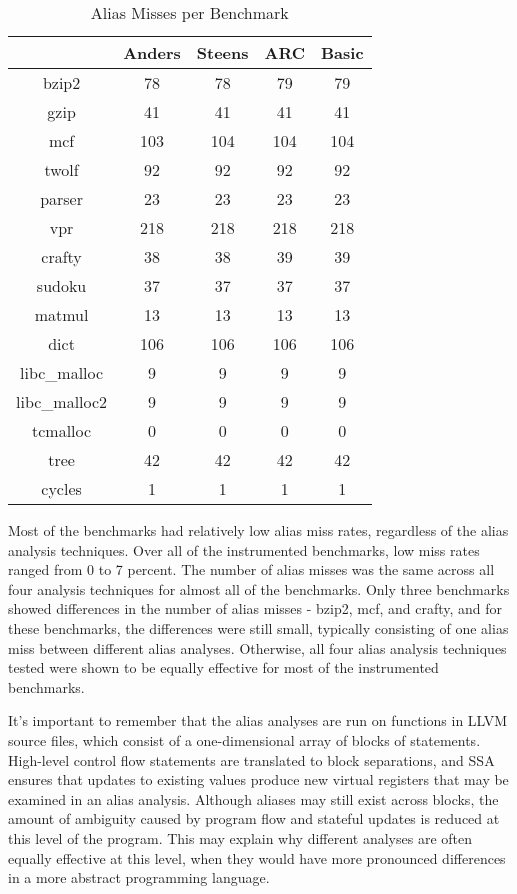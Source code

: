 \begin{table} [h!]
\centering
   \begin{tabular} {|c|c c c c|}
      \hline
      & Anders & Steens & ARC & Basic \\
      \hline
	   bzip2 & 78 & 78 & 79 & 79 \\
      \hline
	   gzip & 41 & 41 & 41 & 41 \\
      \hline
           mcf & 103 & 104 & 104 & 104 \\
      \hline
	   twolf & 92 & 92 & 92 & 92 \\
      \hline
	   parser & 23 & 23 & 23 & 23 \\
      \hline
	   vpr & 218 & 218 & 218 & 218 \\
      \hline
	   crafty & 38 & 38 & 39 & 39 \\
      \hline
	   sudoku & 37 & 37 & 37 & 37 \\
      \hline
	   matmul & 13 & 13 & 13 & 13 \\
      \hline
	   dict & 106 & 106 & 106 & 106 \\
      \hline
	   libc\_malloc & 9 & 9 & 9 & 9 \\
      \hline
	   libc\_malloc2 & 9 & 9 & 9 & 9 \\
      \hline
	   tcmalloc & 0 & 0 & 0 & 0 \\
      \hline
	   tree & 42 & 42 & 42 & 42 \\
      \hline
	   cycles & 1 & 1 & 1 & 1 \\
      \hline
   \end{tabular}
   \caption{Alias Misses per Benchmark}
   \label{table:2}
\end{table}

Most of the benchmarks had relatively low alias miss rates, regardless of the alias analysis techniques. Over all of the instrumented benchmarks, low miss rates ranged from 0 to 7 percent. The number of alias misses was the same across all four analysis techniques for almost all of the benchmarks. Only three benchmarks showed differences in the number of alias misses - bzip2, mcf, and crafty, and for these benchmarks, the differences were still small, typically consisting of one alias miss between different alias analyses. Otherwise, all four alias analysis techniques tested were shown to be equally effective for most of the instrumented benchmarks.

It's important to remember that the alias analyses are run on functions in LLVM source files, which consist of a one-dimensional array of blocks of statements. High-level control flow statements are translated to block separations, and SSA ensures that updates to existing values produce new virtual registers that may be examined in an alias analysis. Although aliases may still exist across blocks, the amount of ambiguity caused by program flow and stateful updates is reduced at this level of the program. This may explain why different analyses are often equally effective at this level, when they would have more pronounced differences in a more abstract programming language.

